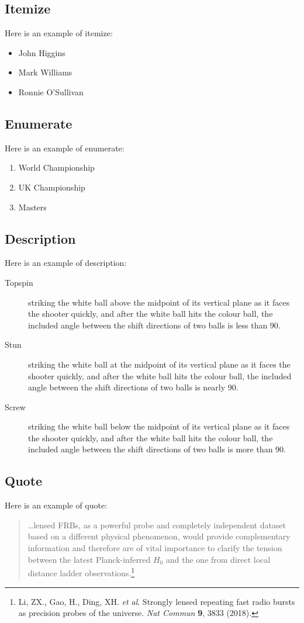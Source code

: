 \documentclass[a4paper,10pt]{article}
\begin{document}
    \subsection{Itemize}
    Here is an example of itemize:
    \begin{itemize}
        \item John Higgins
        \item Mark Williams
        \item Ronnie O'Sullivan
    \end{itemize}
    \subsection{Enumerate}
    Here is an example of enumerate:
    \begin{enumerate}
        \item World Championship
        \item UK Championship
        \item Masters
    \end{enumerate}
    \subsection{Description}
    Here is an example of description:
    \begin{description}
        \item[Topspin] striking the white ball above the midpoint of its
        vertical plane as it faces the shooter quickly, and after the white
        ball hits the colour ball, the included angle between the shift
        directions of two balls is less than 90\textdegree{}.
        \item[Stun] striking the white ball at the midpoint of its vertical
        plane as it faces the shooter quickly, and after the white ball hits
        the colour ball, the included angle between the shift directions of two
        balls is nearly 90\textdegree{}.
        \item[Screw] striking the white ball below the midpoint of its vertical
        plane as it faces the shooter quickly, and after the white ball hits
        the colour ball, the included angle between the shift directions of two
        balls is more than 90\textdegree{}.
    \end{description}
    \subsection{Quote}
    Here is an example of quote:
    \begin{quote}
        \dots lensed FRBs, as a powerful probe and completely independent
        dataset based on a different physical phenomenon, would provide
        complementary information and therefore are of vital importance to
        clarify the tension between the latest Planck-inferred $H_0$ and the
        one from direct local distance ladder observations.\footnote{
            Li, ZX., Gao, H., Ding, XH. \textit{et al}. Strongly lensed
            repeating fast radio bursts as precision probes of the universe.
            \textit{Nat Commun} \textbf{9}, 3833 (2018).}
    \end{quote}
\end{document}
